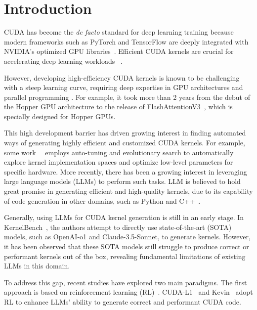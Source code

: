 \section{Introduction}

CUDA has become the \textit{de facto} standard for deep learning training because modern frameworks such as PyTorch and TensorFlow are deeply integrated with NVIDIA’s optimized GPU libraries~\citep{nvidia2025cudnn}. 
Efficient CUDA kernels are crucial for accelerating deep learning workloads~\citep{dao2022flashattention,dao2023flashattention2} . 


However, developing high-efficiency CUDA kernels is known to be challenging with a steep learning curve, requiring deep expertise in GPU architectures and parallel programming \citep{onegraph}.
For example, it took more than 2 years from the debut of the Hopper GPU architecture to the release of FlashAttentionV3~\citep{shah2024flashattention3fastaccurateattention}, which is specially designed for Hopper GPUs. 

This high development barrier has driven growing interest in finding automated ways of generating highly efficient and customized CUDA kernels. For example, some work~\citep{DBLP:conf/pldi/TilletKC19}~\citep{chen2019learningoptimizetensorprograms} employs auto-tuning and evolutionary search to automatically explore kernel implementation spaces and optimize low-level parameters for specific hardware. More recently, there has been a growing interest in leveraging large language models (LLMs) to perform such tasks. LLM is believed to hold great promise in generating efficient and high-quality kernels, due to its capability of code generation in other domains, such as Python and C++~\citep{dong2025surveycodegenerationllmbased,jiang2024surveylargelanguagemodels}. 



 Generally, using LLMs for CUDA kernel generation is still in an early stage. In KernelBench~\citep{ouyang2025kernelbenchllmswriteefficient}, the authors attempt to directly use state-of-the-art (SOTA) models, such as OpenAI-o1 and Claude-3.5-Sonnet, to generate kernels. However, it has been observed that these SOTA models still struggle to produce correct or performant kernels out of the box, revealing fundamental limitations of existing LLMs in this domain. 

To address this gap, recent studies have explored two main paradigms. The first approach is based on reinforcement learning (RL)~\citep{schulman2017proximalpolicyoptimizationalgorithms,shao2024deepseekmathpushinglimitsmathematical}. CUDA-L1~\citep{deepreinforce2025cudal1} and Kevin~\citep{kevin-multi-turn-rl} adopt RL to enhance LLMs' ability to generate correct and performant CUDA code. 

